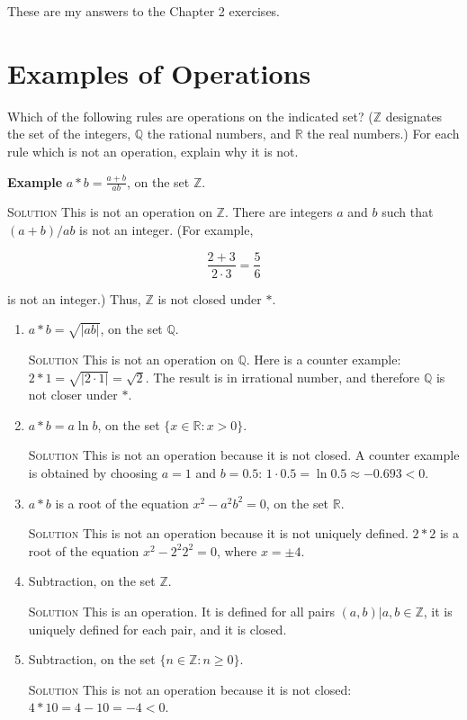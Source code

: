 \documentclass{amsart}
\newcommand{\Rationals}{\mathbb{Q}{}}
\newcommand{\Reals}{\mathbb{R}{}}
\newcommand{\Integers}{\mathbb{Z}{}}
\newcommand{\Solution}{\textsc{Solution}\xspace}
\begin{document}
These are my answers to the Chapter 2 exercises.

\section{Examples of Operations}
Which of the following rules are operations on the indicated set?  ($\Integers$
designates the set of the integers, $\Rationals$ the rational numbers, and
$\Reals$ the real numbers.) For each rule which is not an operation, explain
why it is not. 

\textbf{Example} $a * b = \displaystyle \frac{a + b}{ab}$, on the set
$\Integers$. 

\Solution This is not an operation on  $\Integers$. There are integers
$a$ and $b$ such that $(a+b)/ab$ is not an integer. (For example,

\[
\frac{2+3}{2 \cdot 3} = \frac{5}{6}
\]

is not an integer.) Thus, $\Integers$ is not closed under $*$. 

\begin{enumerate}

\item $a*b = \sqrt{|ab|}$, on the set $\Rationals$. 

\Solution This is not an operation on $\Rationals$. Here is a counter
example: $2*1 = \sqrt{|2 \cdot 1|} = \sqrt{2}$. The result is in irrational
number, and therefore $\Rationals$ is not closer under $*$.


\item $a*b = a \ln b$, on the set $\{x \in \Reals  : x > 0\}$. 

\Solution This is not an operation because it is not closed. A counter 
example is obtained by choosing $a=1$ and $b=0.5$: 
$1 \cdot 0.5 = \ln 0.5 \approx -0.693 < 0$. 


\item $a*b$ is a root of the equation $x^2 - a^2 b^2 = 0$, on the set $\Reals$.


\Solution This is not an operation because it is not uniquely defined.
$2*2$ is a root of the equation $x^2 - 2^2 2^2 = 0$, where $x = \pm 4$.


\item Subtraction, on the set $\Integers$.

\Solution This is an operation. It is defined for all pairs 
${(a,b) | a,b \in \Integers}$, it is uniquely defined for each pair, and it
is closed.


\item Subtraction, on the set $\{ n \in \Integers : n \ge 0\}$.

\Solution This is not an operation because it is not closed:
$4*10 = 4 - 10 = -4 < 0$.



\end{enumerate}
\end{document}
